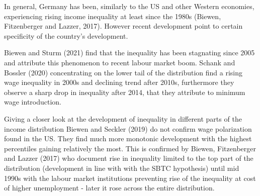 \documentclass{article}
\begin{document}
In general, Germany has been, similarly to the US and other Western economies, experiencing rising income inequality at least since the 1980s (Biewen, Fitzenberger and Lazzer, 2017). However recent development point to certain specificity of the country's development. 

Biewen and Sturm (2021) find that the inequality has been stagnating since 2005 and attribute this phenomenon to recent labour market boom. Schank and Bossler (2020) concentrating on the lower tail of the distribution find a rising wage inequality in 2000s and declining trend after 2010s, furthermore they observe a sharp drop in inequality after 2014, that they attribute to minimum wage introduction.

Giving a closer look at the development of inequality in different parts of the income distribution Biewen and Seckler (2019) do not confirm wage polarization found in the US. They find much more monotonic development with the highest percentiles gaining relatively the most. This is confirmed by Biewen, Fitzenberger and Lazzer (2017) who document rise in inequality limited to the top part of the distribution (development in line with with the SBTC hypothesis) until mid 1990s with the labour market institutions preventing rise of the inequality at cost of higher unemployment  - later it rose across the entire distribution.

\end{document}
